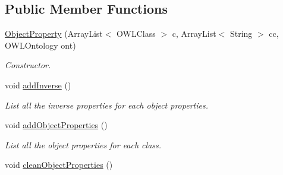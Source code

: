 \subsection*{Public Member Functions}
\begin{DoxyCompactItemize}
\item 
\hyperlink{class_ontology_1_1_object_property_ab113f5a8abdfb074959b82ac5f85e8cc}{ObjectProperty} (ArrayList$<$ OWLClass $>$ c, ArrayList$<$ String $>$ cc, OWLOntology ont)
\begin{DoxyCompactList}\small\item\em Constructor. \end{DoxyCompactList}\item 
void \hyperlink{class_ontology_1_1_object_property_a85c5c789eed6571f9e425accc67520a9}{addInverse} ()
\begin{DoxyCompactList}\small\item\em List all the inverse properties for each object properties. \end{DoxyCompactList}\item 
void \hyperlink{class_ontology_1_1_object_property_a80ef920f9be2281be7739ca58b5c56ce}{addObjectProperties} ()
\begin{DoxyCompactList}\small\item\em List all the object properties for each class. \end{DoxyCompactList}\item 
\hypertarget{class_ontology_1_1_object_property_a3ae4855b888f0c57e9e2b671077a6f81}{
void \hyperlink{class_ontology_1_1_object_property_a3ae4855b888f0c57e9e2b671077a6f81}{cleanObjectProperties} ()}
\label{class_ontology_1_1_object_property_a3ae4855b888f0c57e9e2b671077a6f81}


\end{DoxyCompactItemize}
